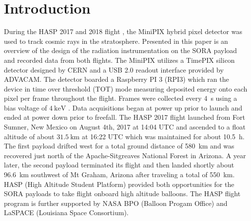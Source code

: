 \section{Introduction}
\label{Introduction}

During the HASP 2017 and 2018 flight \cite{hasp} , the MiniPIX hybrid pixel detector\cite{minipix} was used to track cosmic rays in the stratosphere. 
%
Presented in this paper is an overview of the design of the radiation instrumentation on the SORA payload and recorded data from both flights.
%
The MiniPIX utilizes a TimePIX\cite{timepix} silicon detector designed by CERN\cite{cern} and a USB 2.0 readout interface provided by ADVACAM\cite{advacam}. 
%
The detector boarded a Raspberry PI 3 (RPI3) which ran the device in time over threshold (TOT) mode measuring deposited energy onto each pixel per frame throughout the flight. 
%
Frames were collected every \SI{4}{\second} using a bias voltage of $\SI{4}{\kilo\electronvolt}$ . 
%
Data acquisitions began at power up prior to launch and ended at power down prior to freefall. 
%
The HASP 2017 flight launched from Fort Sumner, New Mexico on August 4th, 2017 at 14:04 UTC and ascended to a float altitude of about $\SI{31.5}{\kilo\meter}$ at 16:22 UTC which was maintained for about \SI{10.5}{\hour}.
%
 The first payload drifted west for a total ground distance of \SI{580}{\kilo\meter} and was recovered just north of the Apache-Sitgreaves National Forest in Arizona. 
 A year later, the second payload terminated its flight and then landed shortly about \SI{96.6}{\kilo\meter} southwest of Mt Graham, Arizona after traveling a total of \SI{550}{\kilo\meter}.
 HASP (High Altitude Student Platform) provided both opportunities for the SORA payloads to take flight onboard high altitude balloons. The HASP flight program is further supported by NASA BPO (Balloon Progam Office) and LaSPACE (Louisiana Space Consortium).
